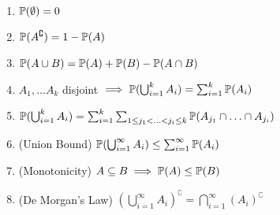 \begin{enumerate}
  \item \(\P(\emptyset) = 0\)
  \item \(\P(A^\complement) = 1 - \P(A)\)
  \item \(\P(A \cup B) = \P(A) + \P(B) - \P(A \cap B)\)
  \item \(A_1, \ldots A_k\) disjoint \(\implies \P(\bigcup_{i=1}^k A_i) = \sum_{i=1}^k \P(A_i)\)
  \item \(\P(\bigcup_{i=1}^k A_i) = \sum_{i=1}^k \sum_{1 \leq j_1 < \ldots < j_i \leq k} \P(A_{j_1} \cap \ldots \cap A_{j_i})\)
  \item (Union Bound) \(\P(\bigcup_{i=1}^\infty A_i) \leq \sum_{i=1}^\infty \P(A_i)\)
  \item (Monotonicity) \(A \subseteq B \implies \P(A) \leq \P(B)\)
  \item (De Morgan's Law) \((\bigcup_{i=1}^\infty A_i)^\complement = \bigcap_{i=1}^\infty (A_i)^\complement\)
\end{enumerate}

